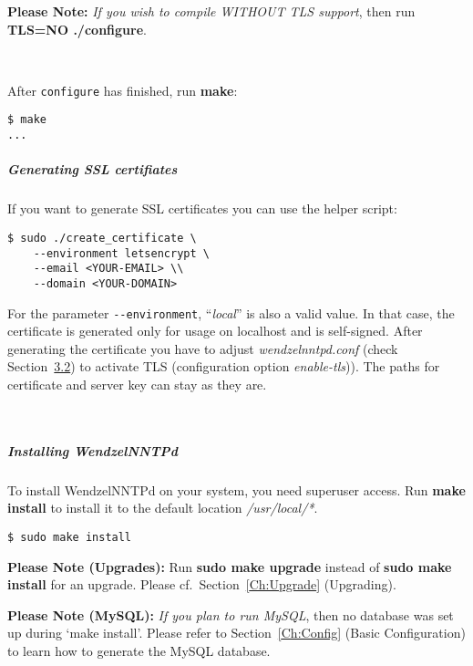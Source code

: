 \documentclass[12pt,fleqn,leqno]{scrbook}
\begin{document}
\textbf{Please Note:} \emph{If you wish to compile WITHOUT TLS support},
then run \textbf{TLS=NO ./configure}.

~

After \texttt{configure} has finished, run \textbf{make}:

\begin{verbatim}
$ make
...
\end{verbatim}

\hypertarget{generating-ssl-certifiates}{%
\subparagraph*{Generating SSL
certifiates}\label{generating-ssl-certifiates}}

If you want to generate SSL certificates you can use the helper script:

\begin{verbatim}
$ sudo ./create_certificate \
    --environment letsencrypt \
    --email <YOUR-EMAIL> \\
    --domain <YOUR-DOMAIN>
\end{verbatim}

For the parameter \texttt{-\/-environment}, ``\emph{local}'' is also a
valid value. In that case, the certificate is generated only for usage
on localhost and is self-signed. After generating the certificate you
have to adjust \emph{wendzelnntpd.conf} (check
Section~\protect\hyperlink{network-settings}{3.2}) to activate TLS
(configuration option \emph{enable-tls})). The paths for certificate and
server key can stay as they are.

~

\hypertarget{installing-wendzelnntpd}{%
\subparagraph*{Installing WendzelNNTPd}\label{installing-wendzelnntpd}}

To install WendzelNNTPd on your system, you need superuser access. Run
\textbf{make install} to install it to the default location
\emph{/usr/local/*}.

\begin{verbatim}
$ sudo make install
\end{verbatim}

\textbf{Please Note (Upgrades):} Run \textbf{sudo make upgrade} instead
of \textbf{sudo make install} for an upgrade. Please
cf.~Section~\protect\hyperlink{Ch:Upgrade}{{[}Ch:Upgrade{]}}
(Upgrading).

\textbf{Please Note (MySQL):} \emph{If you plan to run MySQL}, then no
database was set up during `make install'. Please refer to
Section~\protect\hyperlink{Ch:Config}{{[}Ch:Config{]}} (Basic
Configuration) to learn how to generate the MySQL database.
\end{document}
